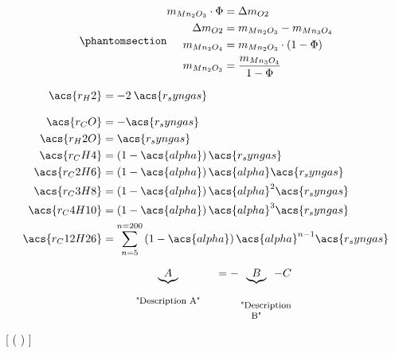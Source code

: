 \begin{equation} \phantomsection \label{eq:phi_m_mm}
\begin{split}
    m_{Mn_2O_3} \cdot \Phi &= \Delta m_{O2} \\
    \Delta m_{O2} &= m_{Mn_2O_3} - m_{Mn_3O_4} \\
    m_{Mn_3O_4} &= m_{Mn_2O_3} \cdot (1-\Phi) \\
    m_{Mn_2O_3} &= \frac{m_{Mn_3O_4}}{1-\Phi}
\end{split}
\end{equation}


\begin{subequations}\label{fml:reaction_rates}
   \begin{align}
          \acs{r_H2} &=-2\:\acs{r_syngas} \label{fml:reaction_rate_rH2} \\[2ex]
					\acs{r_CO} &=-\acs{r_syngas} \label{fml:reaction_rate_rCO} \\
					\acs{r_H2O} &=\acs{r_syngas} \label{fml:reaction_rate_rH2O} \\
					\acs{r_CH4} &=\left(1-\acs{alpha}\right)\acs{r_syngas} \label{fml:reaction_rate_rC1} \\
					\acs{r_C2H6} &=\left(1-\acs{alpha}\right)\acs{alpha} \acs{r_syngas} \label{fml:reaction_rate_rC2} \\
					\acs{r_C3H8} &=\left(1-\acs{alpha}\right)\acs{alpha}^2 \acs{r_syngas} \label{fml:reaction_rate_rC3} \\
					\acs{r_C4H10} &=\left(1-\acs{alpha}\right)\acs{alpha}^3 \acs{r_syngas} \label{fml:reaction_rate_rC4} \\
					\acs{r_C12H26} &=\sum^{n=200}_{n=5}\left(1-\acs{alpha}\right)\acs{alpha}^{n-1} \acs{r_syngas} \label{fml:reaction_rate_rC5}
   \end{align}
\end{subequations}


\mathrm


\begin{equation}
\underbrace{A}_{\parbox{3cm}{\footnotesize\center{"Description A"}}} = - \underbrace{B}_{\parbox{1cm}{\footnotesize\center{"Description B"}}} - C
\label{fml:Example_underbrace}
\end{equation}


{ [ ( ) ] }



